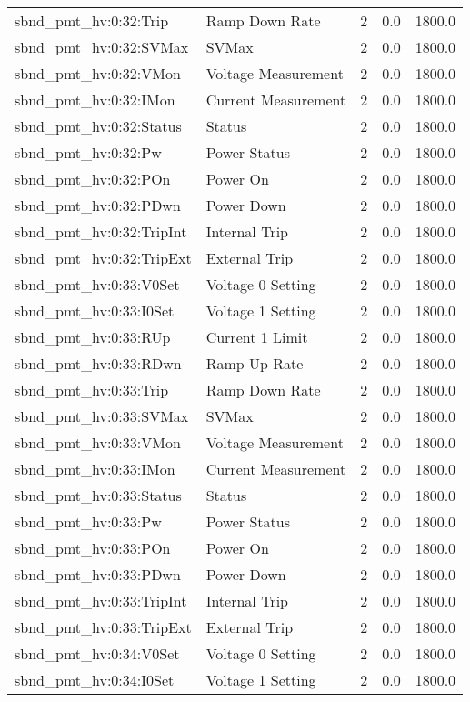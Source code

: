 \begin{center}
\begin{longtable}{l | l l l l }
sbnd\_pmt\_hv:0:32:Trip & Ramp Down Rate & 2 & 0.0 & 1800.0\\ 
sbnd\_pmt\_hv:0:32:SVMax & SVMax & 2 & 0.0 & 1800.0\\ 
sbnd\_pmt\_hv:0:32:VMon & Voltage Measurement & 2 & 0.0 & 1800.0\\ 
sbnd\_pmt\_hv:0:32:IMon & Current Measurement & 2 & 0.0 & 1800.0\\ 
sbnd\_pmt\_hv:0:32:Status & Status & 2 & 0.0 & 1800.0\\ 
sbnd\_pmt\_hv:0:32:Pw & Power Status & 2 & 0.0 & 1800.0\\ 
sbnd\_pmt\_hv:0:32:POn & Power On & 2 & 0.0 & 1800.0\\ 
sbnd\_pmt\_hv:0:32:PDwn & Power Down & 2 & 0.0 & 1800.0\\ 
sbnd\_pmt\_hv:0:32:TripInt & Internal Trip & 2 & 0.0 & 1800.0\\ 
sbnd\_pmt\_hv:0:32:TripExt & External Trip & 2 & 0.0 & 1800.0\\ 
sbnd\_pmt\_hv:0:33:V0Set & Voltage 0 Setting & 2 & 0.0 & 1800.0\\ 
sbnd\_pmt\_hv:0:33:I0Set & Voltage 1 Setting & 2 & 0.0 & 1800.0\\ 
sbnd\_pmt\_hv:0:33:RUp & Current 1 Limit & 2 & 0.0 & 1800.0\\ 
sbnd\_pmt\_hv:0:33:RDwn & Ramp Up Rate & 2 & 0.0 & 1800.0\\ 
sbnd\_pmt\_hv:0:33:Trip & Ramp Down Rate & 2 & 0.0 & 1800.0\\ 
sbnd\_pmt\_hv:0:33:SVMax & SVMax & 2 & 0.0 & 1800.0\\ 
sbnd\_pmt\_hv:0:33:VMon & Voltage Measurement & 2 & 0.0 & 1800.0\\ 
sbnd\_pmt\_hv:0:33:IMon & Current Measurement & 2 & 0.0 & 1800.0\\ 
sbnd\_pmt\_hv:0:33:Status & Status & 2 & 0.0 & 1800.0\\ 
sbnd\_pmt\_hv:0:33:Pw & Power Status & 2 & 0.0 & 1800.0\\ 
sbnd\_pmt\_hv:0:33:POn & Power On & 2 & 0.0 & 1800.0\\ 
sbnd\_pmt\_hv:0:33:PDwn & Power Down & 2 & 0.0 & 1800.0\\ 
sbnd\_pmt\_hv:0:33:TripInt & Internal Trip & 2 & 0.0 & 1800.0\\ 
sbnd\_pmt\_hv:0:33:TripExt & External Trip & 2 & 0.0 & 1800.0\\ 
sbnd\_pmt\_hv:0:34:V0Set & Voltage 0 Setting & 2 & 0.0 & 1800.0\\ 
sbnd\_pmt\_hv:0:34:I0Set & Voltage 1 Setting & 2 & 0.0 & 1800.0\\ 

\end{longtable}
\end{center}
